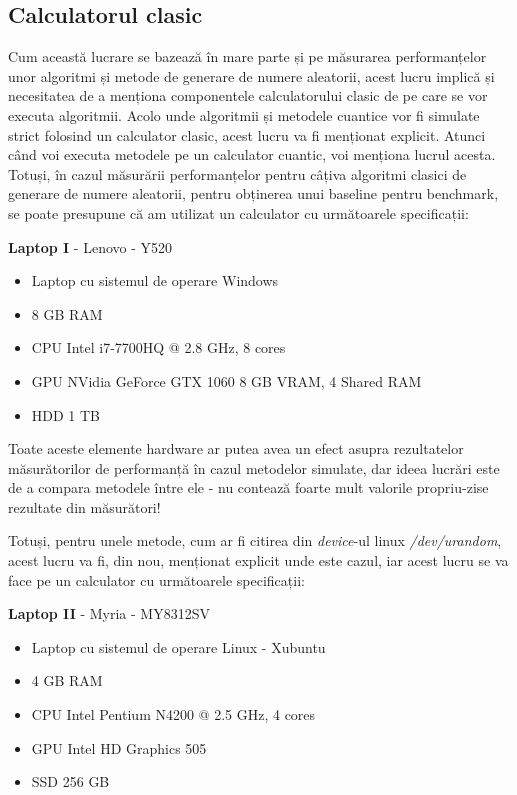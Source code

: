 \subsection{Calculatorul clasic}

Cum această lucrare se bazează în mare parte și pe măsurarea performanțelor unor algoritmi și metode de generare de numere aleatorii, acest lucru implică și necesitatea de a menționa componentele calculatorului clasic de pe care se vor executa algoritmii. Acolo unde algoritmii și metodele cuantice vor fi simulate strict folosind un calculator clasic, acest lucru va fi menționat explicit. Atunci când voi executa metodele pe un calculator cuantic, voi menționa lucrul acesta. Totuși, în cazul măsurării performanțelor pentru câțiva algoritmi clasici de generare de numere aleatorii, pentru obținerea unui baseline pentru benchmark, se poate presupune că am utilizat un calculator cu următoarele specificații:

\vspace{0.5cm}
\textbf{Laptop I} - Lenovo - Y520
\begin{itemize}
    \item Laptop cu sistemul de operare Windows
    \item 8 GB RAM
    \item CPU Intel i7-7700HQ @ 2.8 GHz, 8 cores
    \item GPU NVidia GeForce GTX 1060 8 GB VRAM, 4 Shared RAM
    \item HDD 1 TB
\end{itemize}

Toate aceste elemente hardware ar putea avea un efect asupra rezultatelor măsurătorilor de performanță în cazul metodelor simulate, dar ideea lucrări este de a compara metodele între ele - nu contează foarte mult valorile propriu-zise rezultate din măsurători!

Totuși, pentru unele metode, cum ar fi citirea din \textit{device}-ul linux \textit{/dev/urandom}, acest lucru va fi, din nou, menționat explicit unde este cazul, iar acest lucru se va face pe un calculator cu următoarele specificații:


\vspace{0.5cm}
\textbf{Laptop II}  - Myria - MY8312SV
\begin{itemize}
    \item Laptop cu sistemul de operare Linux - Xubuntu
    \item 4 GB RAM
    \item CPU Intel Pentium N4200 @ 2.5 GHz, 4 cores
    \item GPU Intel HD Graphics 505
    \item SSD 256 GB
\end{itemize}

